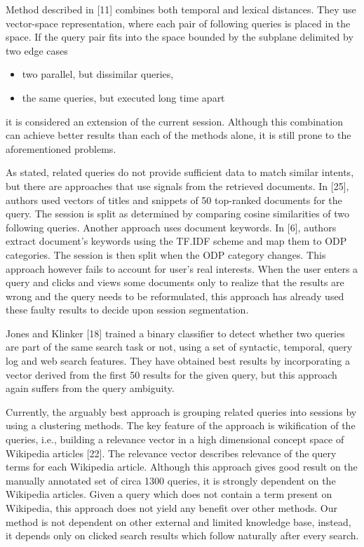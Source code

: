 \documentclass{acm_proc_article-sp} %
\begin{document}
Method described in [11] combines both temporal and lexical
distances. They use vector-space representation, where each
pair of following queries is placed in the space. If the query
pair fits into the space bounded by the subplane delimited
by two edge cases

\begin{itemize} 
	\item two parallel, but dissimilar queries,
	\item the same queries, but executed long time apart
\end{itemize}

it is considered an extension of the current session. Although
this combination can achieve better results than each of the
methods alone, it is still prone to the aforementioned problems.

As stated, related queries do not provide sufficient data to
match similar intents, but there are approaches that use
signals from the retrieved documents. In [25], authors used
vectors of titles and snippets of 50 top-ranked documents
for the query. The session is split as determined by comparing
cosine similarities of two following queries. Another
approach uses document keywords. In [6], authors extract
document’s keywords using the TF.IDF scheme and map
them to ODP categories. The session is then split when the
ODP category changes. This approach however fails to account
for user’s real interests. When the user enters a query
and clicks and views some documents only to realize that the
results are wrong and the query needs to be reformulated,
this approach has already used these faulty results to decide
upon session segmentation.

Jones and Klinker [18] trained a binary classifier to detect
whether two queries are part of the same search task or not,
using a set of syntactic, temporal, query log and web search
features. They have obtained best results by incorporating
a vector derived from the first 50 results for the given query,
but this approach again suffers from the query ambiguity.

Currently, the arguably best approach is grouping related
queries into sessions by using a clustering methods. The
key feature of the approach is wikification of the queries,
i.e., building a relevance vector in a high dimensional concept
space of Wikipedia articles [22]. The relevance vector
describes relevance of the query terms for each Wikipedia
article. Although this approach gives good result on the
manually annotated set of circa 1300 queries, it is strongly
dependent on the Wikipedia articles. Given a query which
does not contain a term present on Wikipedia, this approach
does not yield any benefit over other methods. Our method
is not dependent on other external and limited knowledge
base, instead, it depends only on clicked search results which
follow naturally after every search.
\end{document}
